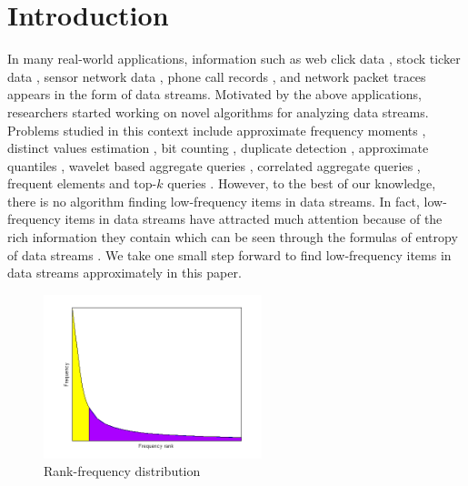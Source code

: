 \documentclass[conference]{IEEEtran}
\begin{document}
\section{Introduction}
In many real-world applications, information such as web click data \cite{IEEEexample:webdata}, stock ticker
data \cite{IEEEexample:stockticker,IEEEexample:stockticker2}, sensor network data \cite{IEEEexample:sensor}, phone call records \cite{IEEEexample:phonecall}, and network packet traces \cite{IEEEexample:packet} appears in the form of data streams. Motivated by the above applications, researchers started working on novel algorithms for analyzing data streams. Problems studied in this context include approximate frequency moments \cite{IEEEexample:frequencymoments}, distinct values estimation \cite{IEEEexample:distinctestimation,IEEEexample:distinctvalues}, bit counting \cite{IEEEexample:bitcounting}, duplicate detection \cite{IEEEexample:sbf,IEEEexample:duplicatedetec}, approximate quantiles \cite{IEEEexample:quantile}, wavelet based aggregate queries \cite{IEEEexample:wavelet}, correlated aggregate queries \cite{IEEEexample:correlated}, frequent elements \cite{IEEEexample:frequent1,IEEEexample:frequent2,IEEEexample:frequent3,IEEEexample:ldsketch} and top-$k$ queries \cite{IEEEexample:spacesaving,IEEEexample:top-k1}. However, to the best of our knowledge, there is no algorithm finding low-frequency items in data streams. In fact, low-frequency items in data streams have attracted much attention because of the rich information they contain which can be seen through the formulas of entropy of data streams \cite{IEEEexample:metropy}. We take one small step forward to find low-frequency items in data streams approximately in this paper.   

\begin{figure}
	\centering
	\includegraphics[width=2.5in]{png/zipf.png}
	\caption{Rank-frequency distribution}
	\label{fig:sim}
\end{figure}
\end{document}
